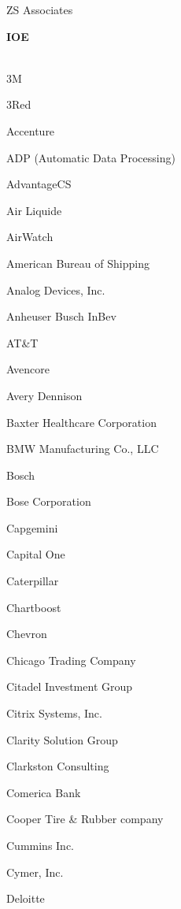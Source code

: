 \documentclass[twoside]{article}
\begin{document}
\begin{center}
\begin{multicols}{5}
\begin{FlushLeft}
\begin{compactitem}
\item ZS Associates
\end{compactitem}
        \end{FlushLeft}
        \vspace{1em}
        {\fontsize{14}{16}\selectfont \bf IOE}\\
        \vspace{-1em}
        ~\hrulefill~
        \vspace{-.9em}
        \begin{FlushLeft}
        \begin{compactitem}
        \item 3M
\item 3Red
\item Accenture
\item ADP (Automatic Data Processing)
\item AdvantageCS
\item Air Liquide
\item AirWatch
\item American Bureau of Shipping
\item Analog Devices, Inc.
\item Anheuser Busch InBev
\item AT\&T
\item Avencore
\item Avery Dennison
\item Baxter Healthcare Corporation
\item BMW Manufacturing Co., LLC
\item Bosch
\item Bose Corporation
\item Capgemini
\item Capital One
\item Caterpillar
\item Chartboost
\item Chevron
\item Chicago Trading Company
\item Citadel Investment Group
\item Citrix Systems, Inc.
\item Clarity Solution Group
\item Clarkston Consulting
\item Comerica Bank
\item Cooper Tire \& Rubber company
\item Cummins Inc.
\item Cymer, Inc.
\item Deloitte

\end{compactitem}
\end{FlushLeft}
\end{multicols}
\end{center}
\end{document}
